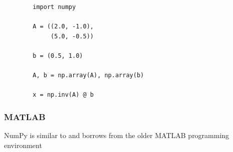 \begin{frame}[fragile]

    \begin{verbatim}
        import numpy 

        A = ((2.0, -1.0),
             (5.0, -0.5))

        b = (0.5, 1.0)

        A, b = np.array(A), np.array(b)

        x = np.inv(A) @ b
    \end{verbatim}

\end{frame}



\begin{frame}
    \frametitle{MATLAB}

    NumPy is similar to and borrows from the older MATLAB programming
    environment

    \vspace{0.5em}
    \vspace{0.5em}
    \begin{figure}
       \begin{center} %
       \end{center}
    \end{figure}


\end{frame}



